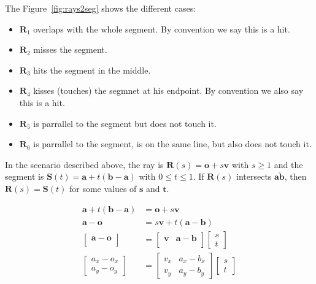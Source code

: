 The Figure~\ref{fig:rays2seg} shows the different cases: 
\begin{itemize}
  \item $\mathbf{R}_1$ overlaps with the whole segment. By convention we say this is a hit.
  \item $\mathbf{R}_2$ misses the segment.
  \item $\mathbf{R}_3$ hits the segment in the middle.
  \item $\mathbf{R}_4$ kisses (touches) the segmnet  at his endpoint. By convention we also say this is a hit.
  \item $\mathbf{R}_5$ is parrallel to the segment but does not touch it.
  \item $\mathbf{R}_6$ is parrallel to the segment, is on the same line, but also does not touch it.
\end{itemize}

In the scenario described above, the ray is $\mathbf{R}(s) = \mathbf{o} + s \mathbf{v}$ with $s \geq 1$ and the segment is $\mathbf{S}(t) = \mathbf{a} + t (\mathbf{b} - \mathbf{a})$ with $0 \leq t \leq 1$.
If $\mathbf{R}(s)$ intersects $\overline{\mathbf{a}\mathbf{b}}$, then $\mathbf{R}(s) = \mathbf{S}(t)$ for some values of $\mathbf{s}$ and $\mathbf{t}$.

\begin{align*}
\mathbf{a} + t (\mathbf{b} - \mathbf{a}) &= \mathbf{o} + s \mathbf{v} \\
\mathbf{a} - \mathbf{o} &= s \mathbf{v} + t (\mathbf{a} - \mathbf{b}) \\
\begin{bmatrix}
\mathbf{a} - \mathbf{o}  \\
 ~ 
\end{bmatrix} &= 
\begin{bmatrix}
\mathbf{v} & \mathbf{a} - \mathbf{b} \\
~ & ~
\end{bmatrix}
\begin{bmatrix}
s \\
t 
\end{bmatrix} \\
\begin{bmatrix}
a_x - o_x  \\
a_y - o_y
\end{bmatrix} &= 
\begin{bmatrix}
v_x & a_x - b_x \\
v_y & a_y - b_y
\end{bmatrix}
\begin{bmatrix}
s \\
t 
\end{bmatrix}
\end{align*}

